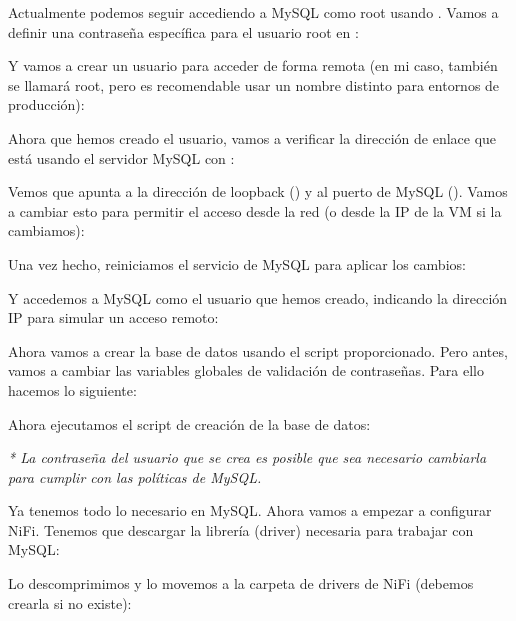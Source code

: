 \documentclass{../../miPlantilla}
\begin{document}
Actualmente podemos seguir accediendo a MySQL como root usando . Vamos a definir una contraseña específica para el usuario root en :


Y vamos a crear un usuario para acceder de forma remota (en mi caso, también se llamará root, pero es recomendable usar un nombre distinto para entornos de producción):


Ahora que hemos creado el usuario, vamos a verificar la dirección de enlace que está usando el servidor MySQL con :


Vemos que apunta a la dirección de loopback () y al puerto de MySQL ().
Vamos a cambiar esto para permitir el acceso desde la red (o desde la IP de la VM si la cambiamos):


Una vez hecho, reiniciamos el servicio de MySQL para aplicar los cambios:


Y accedemos a MySQL como el usuario que hemos creado, indicando la dirección IP para simular un acceso remoto:


Ahora vamos a crear la base de datos usando el script proporcionado. Pero antes, vamos a cambiar las variables globales de validación de contraseñas. Para ello hacemos lo siguiente:


\newpage

Ahora ejecutamos el script de creación de la base de datos:


\textit{* La contraseña del usuario que se crea es posible que sea necesario cambiarla para cumplir con las políticas de MySQL.}


\newpage

Ya tenemos todo lo necesario en MySQL. Ahora vamos a empezar a configurar NiFi. Tenemos que descargar la librería (driver) necesaria para trabajar con MySQL:


Lo descomprimimos y lo movemos a la carpeta de drivers de NiFi (debemos crearla si no existe):

\end{document}
